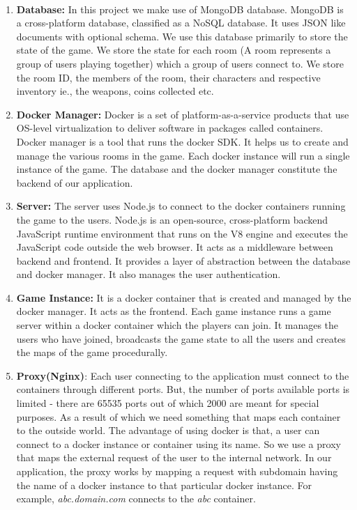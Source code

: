 \documentclass[oneside,12pt]{Classes/VTU}
\begin{document}
	\paragraph{}
	\begin{enumerate}
		\item \textbf{Database:} In this project we make use of MongoDB database. MongoDB is a cross-platform database, classified as a NoSQL database. It uses JSON like documents with optional schema. We use this database primarily to store the state of the game. We store the state for each room (A room represents a group of users playing together) which a group of users connect to. We store the room ID, the members of the room, their characters and respective inventory ie., the weapons, coins collected etc. 
		
		\item \textbf{Docker Manager:} Docker is a set of platform-as-a-service products that use OS-level virtualization to deliver software in packages called containers. Docker manager is a tool that runs the docker SDK. It helps us to create and manage the various rooms in the game. Each docker instance will run a single instance of the game. The database and the docker manager constitute the backend of our application. 
		
		\item \textbf{Server:} The server uses Node.js to connect to the docker containers running the game to the users. Node.js is an open-source, cross-platform backend JavaScript runtime environment that runs on the V8 engine and executes the JavaScript code outside the web browser. It acts as a middleware between backend and frontend. It provides a layer of abstraction between the database and docker manager. It also manages the user authentication. 
		
		\item \textbf{Game Instance:} It is a docker container that is created and managed by the docker manager. It acts as the frontend. Each game instance runs a game server within a docker container which the players can join. It manages the users who have joined, broadcasts the game state to all the users and creates the maps of the game procedurally. 
		
		\item \textbf{Proxy(Nginx)}: Each user connecting to the application must connect to the containers through different ports. But, the number of ports available ports is limited - there are 65535 ports out of which 2000 are meant for special purposes. As a result of which we need something that maps each container to the outside world. The advantage of using docker is that, a user can connect to a docker instance or container using its name. So we use a proxy that maps the external request of the user to the internal network. In our application, the proxy works by mapping a request with subdomain having the name of a docker instance to that particular docker instance. For example, \emph{abc.domain.com} connects to the \emph{abc} container. 
		

\end{enumerate}
\end{document}
